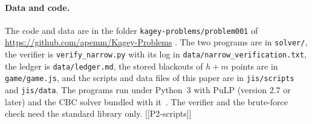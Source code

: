 \paragraph{Data and code.} The code and data are in the folder
\nolinkurl{kagey-problems/problem001} of \url{https://github.com/apemm/Kagey-Problems}
\cite{repo}. The two programs are in \nolinkurl{solver/}, the verifier is
\nolinkurl{verify_narrow.py} with its log in \nolinkurl{data/narrow_verification.txt}, the
ledger is \nolinkurl{data/ledger.md}, the stored blackouts of $h+m$ points are in
\nolinkurl{game/game.js}, and the scripts and data files of this paper are in
\nolinkurl{jis/scripts} and \nolinkurl{jis/data}. The programs run under Python~3 with PuLP
(version $2.7$ or later) and the CBC solver bundled with it~\cite{pulp}. The verifier and the
brute-force check need the standard library only. [[P2-scripts]]

